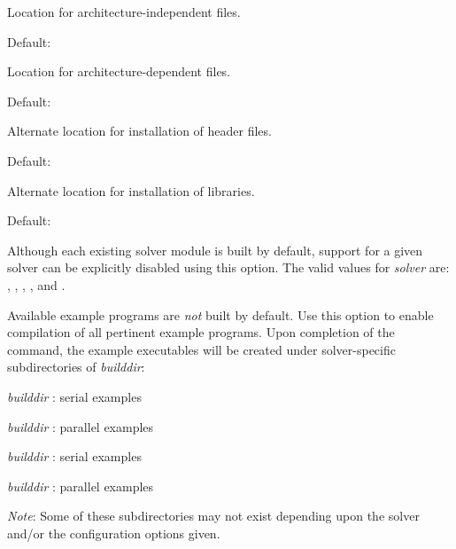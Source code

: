 \begin{config}
  
\item {}
  
  Location for architecture-independent files.
  
  Default: 
  
\item {}

  Location for architecture-dependent files.
  
  Default: 

\item {}
  
  Alternate location for installation of header files.
  
  Default: 
  
\item {}
  
  Alternate location for installation of libraries.
  
  Default: 

\item {}

  Although each existing solver module is built by default, support for a
  given solver can be explicitly disabled using this option. 
  The valid values for {\em solver} are: , , 
  , , and .

\item {}
  
  Available example programs are {\em not} built by default. Use this option
  to enable compilation of all pertinent example programs. Upon completion of 
  the  command, the example executables will be created under solver-specific
  subdirectories of {\em builddir}:
  \begin{config}
  \item {\em builddir} : serial {\C} examples
  \item {\em builddir} : parallel {\C} examples
  \item {\em builddir} : serial {\F} examples
  \item {\em builddir} : parallel {\F} examples
  \end{config}  
  {\em Note}: Some of these subdirectories may not exist depending upon the
  solver and/or the configuration options given.


\end{config}
